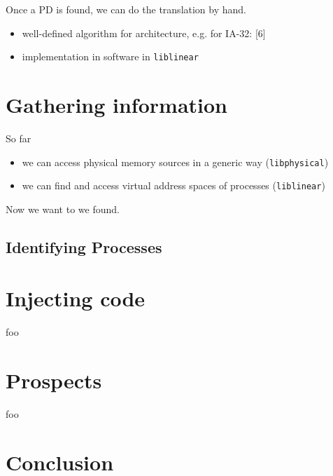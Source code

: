 \documentclass{beamer}
\begin{document}
		\begin{frame}
			Once a PD is found, we can do the translation by hand.
			\begin{itemize}
				\item well-defined algorithm for architecture, e.g. for IA-32: [6]
				\item implementation in software in \texttt{liblinear}
			\end{itemize}
		\end{frame}

\section{Gathering information}

	\begin{frame}
		So far
		\begin{itemize}
			\item we can access physical memory sources in a generic way (\texttt{libphysical})
			\item we can find and access virtual address spaces of processes (\texttt{liblinear})
		\end{itemize}
		Now we want to  we found.
	\end{frame}

	\subsection{Identifying Processes}
	
		\begin{frame}

		\end{frame}

\section{Injecting code}

	\begin{frame}
		foo
	\end{frame}


\section{Prospects}

	\begin{frame}
		foo
	\end{frame}

\section{Conclusion}
\end{document}

